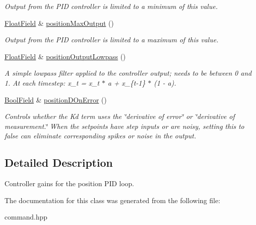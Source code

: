 \begin{DoxyCompactItemize}
\begin{DoxyCompactList}\small\item\em Output from the P\+ID controller is limited to a minimum of this value. \end{DoxyCompactList}\item 
\mbox{\label{classhebi_1_1Command_1_1Settings_1_1Actuator_1_1PositionGains_aa828cf2cab9c16748ccbbdb201de1719}} 
\hyperlink{classhebi_1_1Command_1_1FloatField}{Float\+Field} \& \hyperlink{classhebi_1_1Command_1_1Settings_1_1Actuator_1_1PositionGains_aa828cf2cab9c16748ccbbdb201de1719}{position\+Max\+Output} ()
\begin{DoxyCompactList}\small\item\em Output from the P\+ID controller is limited to a maximum of this value. \end{DoxyCompactList}\item 
\mbox{\label{classhebi_1_1Command_1_1Settings_1_1Actuator_1_1PositionGains_a55a7aa7799b23c147d2ac1be01d27a18}} 
\hyperlink{classhebi_1_1Command_1_1FloatField}{Float\+Field} \& \hyperlink{classhebi_1_1Command_1_1Settings_1_1Actuator_1_1PositionGains_a55a7aa7799b23c147d2ac1be01d27a18}{position\+Output\+Lowpass} ()
\begin{DoxyCompactList}\small\item\em A simple lowpass filter applied to the controller output; needs to be between 0 and 1. At each timestep\+: x\+\_\+t = x\+\_\+t $\ast$ a + x\+\_\+\{t-\/1\} $\ast$ (1 -\/ a). \end{DoxyCompactList}\item 
\mbox{\label{classhebi_1_1Command_1_1Settings_1_1Actuator_1_1PositionGains_af2e5fc61e4d8556424f1e6c87c737c91}} 
\hyperlink{classhebi_1_1Command_1_1BoolField}{Bool\+Field} \& \hyperlink{classhebi_1_1Command_1_1Settings_1_1Actuator_1_1PositionGains_af2e5fc61e4d8556424f1e6c87c737c91}{position\+D\+On\+Error} ()
\begin{DoxyCompactList}\small\item\em Controls whether the Kd term uses the \char`\"{}derivative of error\char`\"{} or \char`\"{}derivative of measurement.\char`\"{} When the setpoints have step inputs or are noisy, setting this to {\ttfamily false} can eliminate corresponding spikes or noise in the output. \end{DoxyCompactList}\end{DoxyCompactItemize}


\subsection{Detailed Description}
Controller gains for the position P\+ID loop. 

The documentation for this class was generated from the following file\+:\begin{DoxyCompactItemize}
\item 
command.\+hpp\end{DoxyCompactItemize}

